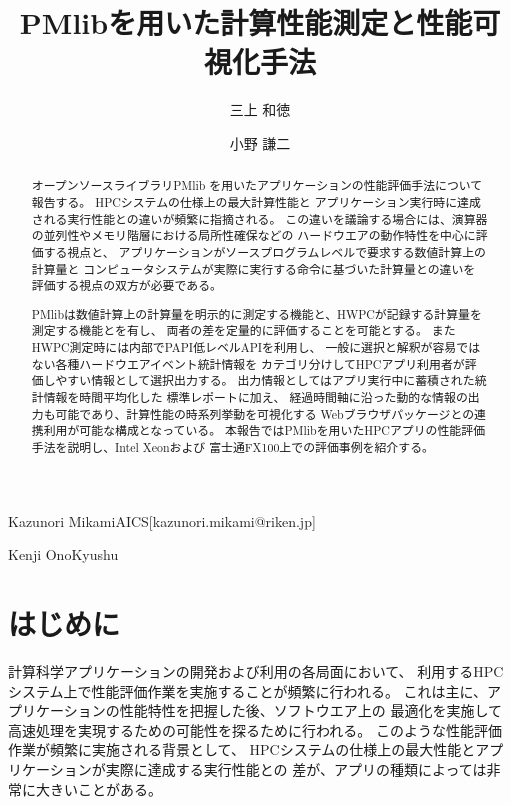 \documentclass[submit,techrep,noauthor]{ipsj}
\begin{document}
\title{PMlibを用いた計算性能測定と性能可視化手法}


\author{三上 和徳}{Kazunori Mikami}{AICS}[kazunori.mikami@riken.jp]
\author{小野 謙二}{Kenji Ono}{Kyushu}

\begin{abstract}
オープンソースライブラリPMlib
を用いたアプリケーションの性能評価手法について報告する。
HPCシステムの仕様上の最大計算性能と
アプリケーション実行時に達成される実行性能との違いが頻繁に指摘される。
この違いを議論する場合には、演算器の並列性やメモリ階層における局所性確保などの
ハードウエアの動作特性を中心に評価する視点と、
アプリケーションがソースプログラムレベルで要求する数値計算上の計算量と
コンピュータシステムが実際に実行する命令に基づいた計算量との違いを
評価する視点の双方が必要である。

PMlibは数値計算上の計算量を明示的に測定する機能と、HWPCが記録する計算量を
測定する機能とを有し、
両者の差を定量的に評価することを可能とする。
またHWPC測定時には内部でPAPI低レベルAPIを利用し、
一般に選択と解釈が容易ではない各種ハードウエアイベント統計情報を
カテゴリ分けしてHPCアプリ利用者が評価しやすい情報として選択出力する。
出力情報としてはアプリ実行中に蓄積された統計情報を時間平均化した
標準レポートに加え、
経過時間軸に沿った動的な情報の出力も可能であり、計算性能の時系列挙動を可視化する
Webブラウザパッケージとの連携利用が可能な構成となっている。
本報告ではPMlibを用いたHPCアプリの性能評価手法を説明し、Intel Xeonおよび
富士通FX100上での評価事例を紹介する。
\end{abstract}

\maketitle

\section{はじめに}
計算科学アプリケーションの開発および利用の各局面において、
利用するHPCシステム上で性能評価作業を実施することが頻繁に行われる。
これは主に、アプリケーションの性能特性を把握した後、ソフトウエア上の
最適化を実施して高速処理を実現するための可能性を探るために行われる。
このような性能評価作業が頻繁に実施される背景として、
HPCシステムの仕様上の最大性能とアプリケーションが実際に達成する実行性能との
差が、アプリの種類によっては非常に大きいことがある。
\end{document}
